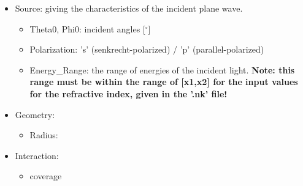 \begin{itemize}
   \item Source: giving the characteristics of the incident plane wave.
      \begin{itemize}
         \item Theta0, Phi0: incident angles [$^{\circ}$]
         \item Polarization: 's' (senkrecht-polarized) / 'p' (parallel-polarized)
         \item Energy\_Range: the range of energies of the incident light. \textbf{Note: this range
            must be within the range of [x1,x2] for the input values for the refractive index, given
         in the '.nk' file!}
      \end{itemize}

   \item Geometry:
      \begin{itemize}
         \item Radius:
      \end{itemize}

   \item Interaction:
      \begin{itemize}
         \item coverage
      \end{itemize}
\end{itemize}
